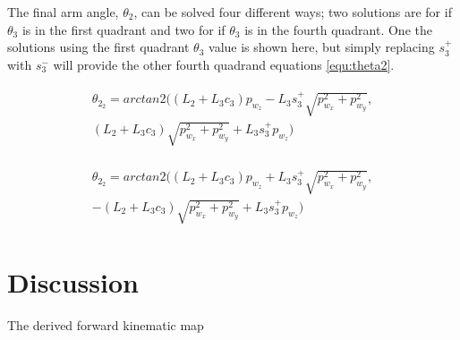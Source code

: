 \documentclass[10pt,journal]{IEEEtran}
\begin{document}
The final arm angle, $\theta_2$, can be solved four different ways; two solutions are for if $\theta_3$ is in the first quadrant and two for if $\theta_3$ is in the fourth quadrant. One the solutions using the first quadrant $\theta_3$ value is shown here, but simply replacing $s_3^+$ with $s_3^-$ will provide the other fourth quadrand equations \ref{equ:theta2}.

\begin{align}\label{equ:theta2}
\begin{split}
	\theta_{2_2} = arctan2((L_2 + L_3 c_3) p_{w_z} - L_3 s^+_3 \sqrt{p^2_{w_x} + p^2_{w_y}},
	\\ (L_2+L_3 c_3) \sqrt{p^2_{w_x} + p^2_{w_y}}+ L_3 s^+_3 p_{w_z})
\end{split}
\end{align}

\begin{align}\label{equ:theta2}
\begin{split}
	\theta_{2_2} = arctan2((L_2 + L_3 c_3) p_{w_z} + L_3 s^+_3 \sqrt{p^2_{w_x} + p^2_{w_y}},
	\\ -(L_2+L_3 c_3) \sqrt{p^2_{w_x} + p^2_{w_y}}+ L_3 s^+_3 p_{w_z})
\end{split}
\end{align}

\section{Discussion}
The derived forward kinematic map 

 
 
\end{document}
